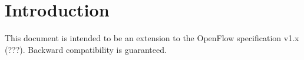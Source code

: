 
\chapter{Introduction}
This document is intended to be an extension to the OpenFlow specification v1.x (???). Backward compatibility is guaranteed.


